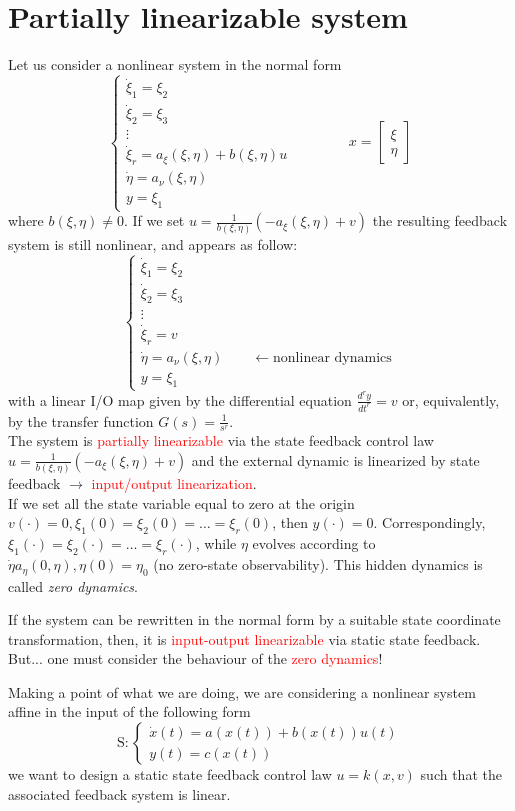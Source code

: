 \section{Partially linearizable system}
Let us consider a nonlinear system in the normal form
\[
\begin{cases}
	\dot{\xi}_1=\xi_2\\
	\dot{\xi}_2=\xi_3\\
	\vdots\\
	\dot{\xi}_r=a_{\xi}(\xi,\eta)+b(\xi,\eta)u\\
	\dot{\eta}=a_{\nu}(\xi,\eta)\\
	y=\xi_1
\end{cases}
\qquad \qquad
x=\begin{bmatrix}
	\xi\\\eta
\end{bmatrix}
\] where $b(\xi,\eta)\neq0$. If we set $u=\frac{1}{b(\xi,\eta)}(-a_{\xi}(\xi,\eta)+v)$ the resulting feedback system is still nonlinear, and appears as follow:
\[
\begin{cases}
	\dot{\xi}_1=\xi_2\\
	\dot{\xi}_2=\xi_3\\
	\vdots\\
	\dot{\xi}_r=v\\
	\boxed{\dot{\eta}=a_{\nu}(\xi,\eta)}\qquad \leftarrow\text{nonlinear dynamics}\\
	y=\xi_1
\end{cases}
\] with a linear I/O map given by the differential equation $\frac{d^ry}{dt^r}=v$ or, equivalently, by the transfer function $G(s)=\frac{1}{s^r}$.\\The system is \textcolor{red}{partially linearizable} via the state feedback control law  $u=\frac{1}{b(\xi,\eta)}(-a_{\xi}(\xi,\eta)+v)$ and the external dynamic is linearized by state feedback $\rightarrow$ \textcolor{red}{input/output linearization}.\\If we set all the state variable equal to zero at the origin $v(\cdot)=0, \xi_1(0)=\xi_2(0)=\dots=\xi_r(0)$, then $y(\cdot)=0$. Correspondingly, $\xi_1(\cdot)=\xi_2(\cdot)=\dots=\xi_r(\cdot)$, while $\eta$ evolves according to $\dot{\eta}a_{\eta}(0,\eta),\eta(0)=\eta_0$ (no zero-state observability). This hidden dynamics is called \emph{zero dynamics}.
\begin{tcolorbox}[colframe=red!50!white, arc=0mm, colback=white]
If the system can be rewritten in the normal form by a suitable state coordinate transformation, then, it is \textcolor{red}{input-output linearizable} via static state feedback.
But... one must consider the behaviour of the \textcolor{red}{zero dynamics}!
\end{tcolorbox}Making a point of what we are doing, we are considering a nonlinear system affine in the input of the following form \[\text{S}: \begin{cases}
\dot{x}(t)=a(x(t))+b(x(t))u(t)\\
y(t)=c(x(t))
\end{cases}
\] we want to design a static state feedback control law $u=k(x,v)$ such that the associated feedback system is linear.
